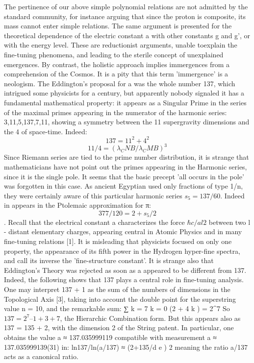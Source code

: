 The pertinence of our above simple polynomial relations are not admitted by the standard
community, for instance arguing that since the proton is composite, its mass cannot enter simple
relations. The same argument is presented for the theoretical dependence of the electric constant a
with other constants g and g', or with the energy level. These are reductionist arguments, unable toexplain the fine-tuning phenomena, and leading to the sterile concept of unexplained emergences.
By contrast, the holistic approach implies immergences from a comprehension of the Cosmos. It is a
pity that this term 'immergence' is a neologism.
The Eddington's proposal for a was the whole number 137, which intrigued some physicists for a
century, but apparently nobody signaled it has a fundamental mathematical property: it appears as a
Singular Prime in the series of the maximal primes appearing in the numerator of the harmonic
series: 3,11,5,137,7,11, showing a symmetry between the 11 supergravity dimensions and the 4 of
space-time. Indeed:
$$137 = 11^2 + 4^2$$
$$11/4 = ( \lambda_CNB /\lambda_CMB )^3$$
Since Riemann series are tied to the prime number distribution, it is strange that mathematicians
have not point out the primes appearing in the Harmonic series, since it is the single pole. It seems
that the basic precept 'all occurs in the pole' was forgotten in this case. As ancient Egyptian used
only fractions of type 1/n, they were certainly aware of this particular harmonic series $s_5 = 137/60$.
Indeed in appears in the Ptolemaic approximation for π: $$377/120 = 2 + s_5 /2$$.
Recall that the electrical constant a characterizes the force $\hbar c/al2$ between two l - distant
elementary charges, appearing central in Atomic Physics and in many fine-tuning relations [1]. It is
misleading that physicists focused on only one property, the appearance of its fifth power in the
Hydrogen hyper-fine spectra, and call its inverse the 'fine-structure constant'. It is strange also that
Eddington's Theory was rejected as soon as a appeared to be different from 137. Indeed, the
following shows that 137 plays a central role in fine-tuning analysis. One may interpret 137 + 1 as
the sum of the numbers of dimensions in the Topological Axis [3], taking into account the double
point for the superstring value n = 10, and the remarkable sum:
∑
k = 7
k = 0
(2 + 4 k ) = 2^7
So $137 = 2^7 – 1 + 3 + 7$, the Hierarchic Combination form. But this appears also as 137 = 135 + 2,
with the dimension 2 of the String patent. In particular, one obtains the value a ≈ 137.035999119
compatible with measurement a ≈ 137.035999139(31) in:
ln137/ln(a/137) ≈ (2+135/d e ) 2
meaning the ratio a/137 acts as a canonical ratio.

